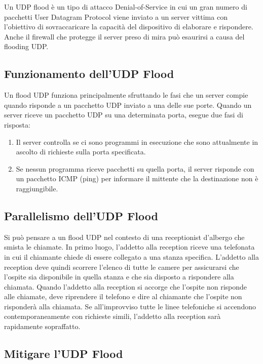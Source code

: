 Un UDP flood è un tipo di attacco Denial-of-Service in cui un gran numero di pacchetti User Datagram Protocol viene inviato a un server vittima con l'obiettivo di sovraccaricare la capacità del dispositivo di elaborare e rispondere. Anche il firewall che protegge il server preso di mira può esaurirsi a causa del flooding UDP.

\subsection{Funzionamento dell'UDP Flood}

Un flood UDP funziona principalmente sfruttando le fasi che un server compie quando risponde a un pacchetto UDP inviato a una delle sue porte. Quando un server riceve un pacchetto UDP su una determinata porta, esegue due fasi di risposta:

\begin{enumerate}
    \item Il server controlla se ci sono programmi in esecuzione che sono attualmente in ascolto di richieste sulla porta specificata.
    \item Se nessun programma riceve pacchetti su quella porta, il server risponde con un pacchetto ICMP (ping) per informare il mittente che la destinazione non è raggiungibile.
\end{enumerate}

\subsection{Parallelismo dell'UDP Flood}

Si può pensare a un flood UDP nel contesto di una receptionist d'albergo che smista le chiamate. In primo luogo, l'addetto alla reception riceve una telefonata in cui il chiamante chiede di essere collegato a una stanza specifica. L'addetto alla reception deve quindi scorrere l'elenco di tutte le camere per assicurarsi che l'ospite sia disponibile in quella stanza e che sia disposto a rispondere alla chiamata. Quando l'addetto alla reception si accorge che l'ospite non risponde alle chiamate, deve riprendere il telefono e dire al chiamante che l'ospite non risponderà alla chiamata. Se all'improvviso tutte le linee telefoniche si accendono contemporaneamente con richieste simili, l'addetto alla reception sarà rapidamente sopraffatto.

\subsection{Mitigare l'UDP Flood}

